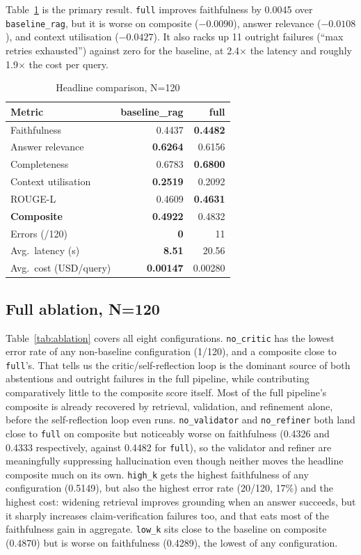 \documentclass[conference]{IEEEtran}
\begin{document}
Table~\ref{tab:headline} is the primary result. \texttt{full} improves faithfulness by
0.0045 over \texttt{baseline\_rag}, but it is worse on composite ($-0.0090$), answer
relevance ($-0.0108$), and context utilisation ($-0.0427$). It also racks up 11 outright
failures (``max retries exhausted'') against zero for the baseline, at 2.4$\times$ the
latency and roughly 1.9$\times$ the cost per query.

\begin{table}[t]
\centering
\caption{Headline comparison, N=120}
\label{tab:headline}
\begin{tabular}{lrr}
\toprule
Metric & baseline\_rag & full \\
\midrule
Faithfulness & 0.4437 & \textbf{0.4482} \\
Answer relevance & \textbf{0.6264} & 0.6156 \\
Completeness & 0.6783 & \textbf{0.6800} \\
Context utilisation & \textbf{0.2519} & 0.2092 \\
ROUGE-L & 0.4609 & \textbf{0.4631} \\
\textbf{Composite} & \textbf{0.4922} & 0.4832 \\
Errors (/120) & \textbf{0} & 11 \\
Avg.\ latency (s) & \textbf{8.51} & 20.56 \\
Avg.\ cost (USD/query) & \textbf{0.00147} & 0.00280 \\
\bottomrule
\end{tabular}
\end{table}

\subsection{Full ablation, N=120}

Table~\ref{tab:ablation} covers all eight configurations. \texttt{no\_critic} has the
lowest error rate of any non-baseline configuration (1/120), and a composite close to
\texttt{full}'s. That tells us the critic/self-reflection loop is the dominant source
of both abstentions and outright failures in the full pipeline, while contributing
comparatively little to the composite score itself. Most of the full pipeline's
composite is already recovered by retrieval, validation, and refinement alone, before
the self-reflection loop even runs. \texttt{no\_validator} and \texttt{no\_refiner}
both land close to \texttt{full} on composite but noticeably worse on faithfulness
(0.4326 and 0.4333 respectively, against 0.4482 for \texttt{full}), so the validator and
refiner are meaningfully suppressing hallucination even though neither moves the
headline composite much on its own. \texttt{high\_k} gets the highest faithfulness of
any configuration (0.5149), but also the highest error rate (20/120, 17\%) and the
highest cost: widening retrieval improves grounding when an answer succeeds, but it
sharply increases claim-verification failures too, and that eats most of the
faithfulness gain in aggregate. \texttt{low\_k} sits close to the baseline on composite
(0.4870) but is worse on faithfulness (0.4289), the lowest of any configuration.
\end{document}
